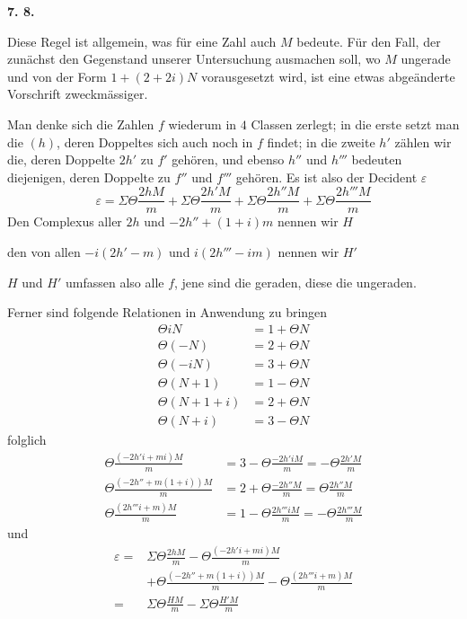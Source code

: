 \par\medskip{}\centerline{\textbf{7. 8.}}\nobreak\smallskip
Diese Regel ist allgemein, was für eine Zahl auch $M$ bedeute. Für den Fall, der zunächst den Gegenstand unserer Untersuchung ausmachen soll, wo $M$ ungerade und von der Form $1+(2+2i)N$ vorausgesetzt wird, ist eine etwas abgeänderte Vorschrift zweckmässiger.

Man denke sich die Zahlen $f$ wiederum in $4$ Classen zerlegt; in die erste setzt man die $(h)$, deren Doppeltes sich auch noch in $f$ findet; in die zweite $h'$ zählen wir die, deren Doppelte $2h'$ zu $f'$ gehören, und ebenso $h''$ und $h'''$ bedeuten diejenigen, deren Doppelte zu $f''$ und $f'''$ gehören. Es ist also der Decident $\varepsilon$
\[
\varepsilon=\Sigma\Theta\frac{2hM}{m}+\Sigma\Theta\frac{2h'M}{m}+\Sigma\Theta\frac{2h''M}{m}+\Sigma\Theta\frac{2h'''M}{m}
\]
Den Complexus aller $2h$ und $-2h''+(1+i)m$ nennen wir $H$

den von allen $-i(2h'-m)$ und $i(2h'''-im)$ nennen wir $H'$

$H$ und $H'$ umfassen also alle $f$, jene sind die geraden, diese die ungeraden.

Ferner sind folgende Relationen in Anwendung zu bringen
\[
\begin{aligned}
\Theta iN&=1+\Theta N\\
\Theta(-N)&=2+\Theta N\\
\Theta(-iN)&=3+\Theta N\\
\Theta(N+1)&=1-\Theta N\\
\Theta(N+1+i)&=2+\Theta N\\
\Theta(N+i)&=3-\Theta N
\end{aligned}
\]
folglich
\[
\begin{aligned}
\Theta\frac{(-2h'i+mi)M}{m}&=3-\Theta\frac{-2h'iM}{m}=-\Theta\frac{2h'M}{m}\\
\Theta\frac{(-2h''+m(1+i))M}{m}&=2+\Theta\frac{-2h''M}{m}=\Theta\frac{2h''M}{m}\\
\Theta\frac{(2h'''i+m)M}{m}&=1-\Theta\frac{2h'''iM}{m}=-\Theta\frac{2h'''M}{m}
\end{aligned}
\]
und
\[
\begin{aligned}
\varepsilon={}&\Sigma\Theta\frac{2hM}{m}-\Theta\frac{(-2h'i+mi)M}{m}\\
&+\Theta\frac{(-2h''+m(1+i))M}{m}-\Theta\frac{(2h'''i+m)M}{m}\\
={}&\Sigma\Theta\frac{HM}{m}-\Sigma\Theta\frac{H'M}{m}
\end{aligned}
\]

